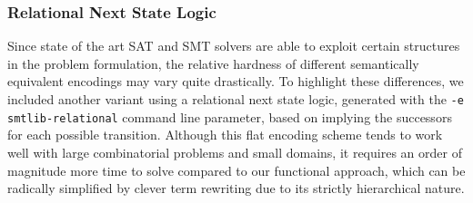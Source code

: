\newpage

\subsubsection*{Relational Next State Logic}

Since state of the art SAT and SMT solvers are able to exploit certain structures in the problem formulation, the relative hardness of different semantically equivalent encodings may vary quite drastically.
To highlight these differences,
we included another variant using a relational next state logic,
generated with the \texttt{-e smtlib-relational} command line parameter, %
based on implying the successors for each possible transition.
Although this flat encoding scheme tends to work well with large combinatorial problems and small domains, it requires an order of magnitude more time to solve compared to our functional approach, which can be radically simplified by clever term rewriting due to its strictly hierarchical nature. %

